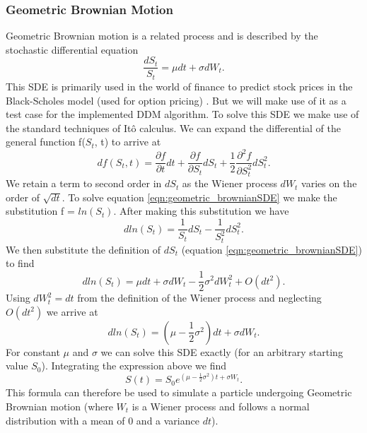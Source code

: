 \documentclass[10pt]{article}
\begin{document}
\subsubsection{Geometric Brownian Motion}
Geometric Brownian motion is a related process and is described by the stochastic differential equation 
\begin{equation}
\label{eqn:geometric_brownianSDE}
\frac{dS_t}{S_t} = \mu dt + \sigma dW_t.
\end{equation}
This SDE is primarily used in the world of finance to predict stock prices in the Black-Scholes model (used for option pricing) \cite{sde}. But we will make use of it as a test case for the implemented DDM algorithm. To solve this SDE we make use of the standard techniques of Itô calculus. We can expand the differential of the general function f($S_t$, t) to arrive at
\begin{equation}
df(S_t, t) = \frac{\partial f}{\partial t} dt + \frac{\partial f}{\partial S_t} dS_t + \frac{1}{2} \frac{\partial^2 f}{\partial S_t^2} dS_t^2.
\end{equation}
We retain a term to second order in $dS_t$ as the Wiener process $dW_t$ varies on the order of $\sqrt{dt}$. To solve equation \ref{eqn:geometric_brownianSDE} we make the substitution f = $ln(S_t)$. After making this substitution we have
\begin{equation}
dln(S_t) = \frac{1}{S_t}dS_t  - \frac{1}{S_t^2}dS_t^2.
\end{equation}
We then substitute the definition of $dS_t$ (equation \ref{eqn:geometric_brownianSDE}) to find
\begin{equation}
dln(S_t) = \mu dt + \sigma dW_t - \frac{1}{2} \sigma^2 dW_t^2 + O(dt^2).
\end{equation}
Using $dW_t^2 = dt$ from the definition of the Wiener process and neglecting $O(dt^2)$ we arrive at
\begin{equation}
dln(S_t) = (\mu - \frac{1}{2} \sigma^2) dt + \sigma dW_t.
\end{equation}
For constant $\mu$ and $\sigma$ we can solve this SDE exactly (for an arbitrary starting value $S_0$). Integrating the expression above we find
\begin{equation}
\label{eqn:geometric_brownian_equation}
S(t) = S_0 e^{(\mu - \frac{1}{2} \sigma^2) t + \sigma W_t}.
\end{equation}
This formula can therefore be used to simulate a particle undergoing Geometric Brownian motion (where $W_t$ is a Wiener process and follows a normal distribution with a mean of 0 and a variance $dt$).
\end{document}
